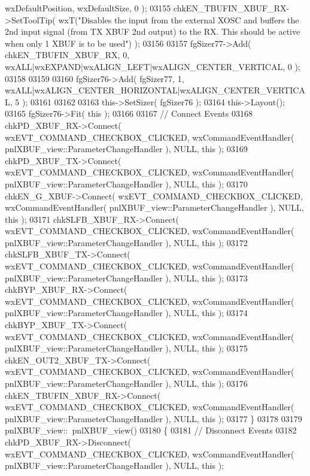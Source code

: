 \begin{DoxyCode}
      wxDefaultPosition, wxDefaultSize, 0 );
03155     chkEN_TBUFIN_XBUF_RX->SetToolTip( wxT(\textcolor{stringliteral}{"Disables the input from the external XOSC and buffers the 2nd
       input signal (from TX XBUF 2nd output) to the RX. This should be active when only 1 XBUF is to be used"}) );
03156     
03157     fgSizer77->Add( chkEN_TBUFIN_XBUF_RX, 0, wxALL|wxEXPAND|wxALIGN\_LEFT|wxALIGN\_CENTER\_VERTICAL, 0 );
03158     
03159     
03160     fgSizer76->Add( fgSizer77, 1, wxALL|wxALIGN\_CENTER\_HORIZONTAL|wxALIGN\_CENTER\_VERTICAL, 5 );
03161     
03162     
03163     this->SetSizer( fgSizer76 );
03164     this->Layout();
03165     fgSizer76->Fit( \textcolor{keyword}{this} );
03166     
03167     \textcolor{comment}{// Connect Events}
03168     chkPD_XBUF_RX->Connect( wxEVT\_COMMAND\_CHECKBOX\_CLICKED, wxCommandEventHandler( 
      pnlXBUF_view::ParameterChangeHandler ), NULL, \textcolor{keyword}{this} );
03169     chkPD_XBUF_TX->Connect( wxEVT\_COMMAND\_CHECKBOX\_CLICKED, wxCommandEventHandler( 
      pnlXBUF_view::ParameterChangeHandler ), NULL, \textcolor{keyword}{this} );
03170     chkEN_G_XBUF->Connect( wxEVT\_COMMAND\_CHECKBOX\_CLICKED, wxCommandEventHandler( 
      pnlXBUF_view::ParameterChangeHandler ), NULL, \textcolor{keyword}{this} );
03171     chkSLFB_XBUF_RX->Connect( wxEVT\_COMMAND\_CHECKBOX\_CLICKED, wxCommandEventHandler( 
      pnlXBUF_view::ParameterChangeHandler ), NULL, \textcolor{keyword}{this} );
03172     chkSLFB_XBUF_TX->Connect( wxEVT\_COMMAND\_CHECKBOX\_CLICKED, wxCommandEventHandler( 
      pnlXBUF_view::ParameterChangeHandler ), NULL, \textcolor{keyword}{this} );
03173     chkBYP_XBUF_RX->Connect( wxEVT\_COMMAND\_CHECKBOX\_CLICKED, wxCommandEventHandler( 
      pnlXBUF_view::ParameterChangeHandler ), NULL, \textcolor{keyword}{this} );
03174     chkBYP_XBUF_TX->Connect( wxEVT\_COMMAND\_CHECKBOX\_CLICKED, wxCommandEventHandler( 
      pnlXBUF_view::ParameterChangeHandler ), NULL, \textcolor{keyword}{this} );
03175     chkEN_OUT2_XBUF_TX->Connect( wxEVT\_COMMAND\_CHECKBOX\_CLICKED, wxCommandEventHandler( 
      pnlXBUF_view::ParameterChangeHandler ), NULL, \textcolor{keyword}{this} );
03176     chkEN_TBUFIN_XBUF_RX->Connect( wxEVT\_COMMAND\_CHECKBOX\_CLICKED, wxCommandEventHandler( 
      pnlXBUF_view::ParameterChangeHandler ), NULL, \textcolor{keyword}{this} );
03177 \}
03178 
03179 pnlXBUF_view::~pnlXBUF_view()
03180 \{
03181     \textcolor{comment}{// Disconnect Events}
03182     chkPD_XBUF_RX->Disconnect( wxEVT\_COMMAND\_CHECKBOX\_CLICKED, wxCommandEventHandler( 
      pnlXBUF_view::ParameterChangeHandler ), NULL, \textcolor{keyword}{this} );

\end{DoxyCode}
